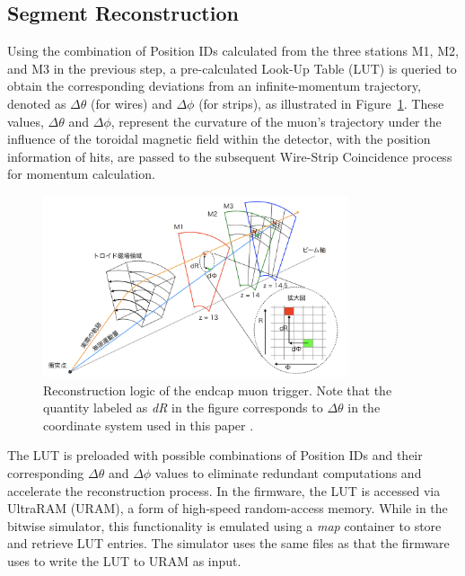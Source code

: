 \subsection{Segment Reconstruction} \label{subsec:SegRec}
Using the combination of Position IDs calculated from the three stations M1, M2, and M3 in the previous step, a pre-calculated Look-Up Table (LUT) is queried to obtain the corresponding deviations from an infinite-momentum trajectory, denoted as $\Delta\theta$ (for wires) and $\Delta\phi$ (for strips), as illustrated in Figure~\ref{fig:EndcapTriggerLogic}. These values, $\Delta\theta$ and $\Delta\phi$, represent the curvature of the muon’s trajectory under the influence of the toroidal magnetic field within the detector, with the position information of hits, are passed to the subsequent Wire-Strip Coincidence process for momentum calculation.

\begin{figure}[htbp]
  \centering
  \includegraphics[width=0.8\textwidth]{figs/chapter5/endcap_trigger_logic_concept.png}
  \caption{Reconstruction logic of the endcap muon trigger. Note that the quantity labeled as \textit{dR} in the figure corresponds to $\Delta\theta$ in the coordinate system used in this paper \cite{akatsuka}.}
  \label{fig:EndcapTriggerLogic}
\end{figure}

The LUT is preloaded with possible combinations of Position IDs and their corresponding $\Delta\theta$ and $\Delta\phi$ values to eliminate redundant computations and accelerate the reconstruction process. In the firmware, the LUT is accessed via UltraRAM (URAM), a form of high-speed random-access memory. While in the bitwise simulator, this functionality is emulated using a \textit{map} container to store and retrieve LUT entries. The simulator uses the same files as that the firmware uses to write the LUT to URAM as input.

